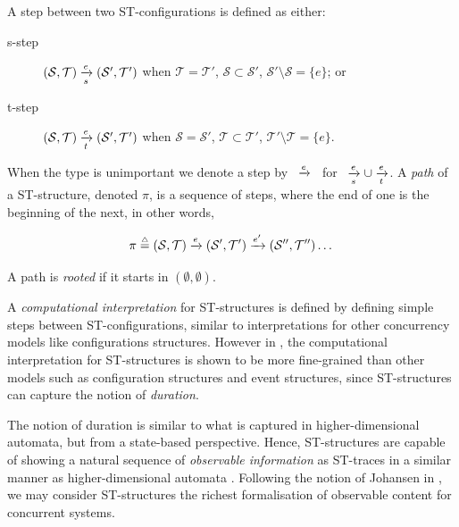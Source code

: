     \begin{definition}
    \label{def:st-steps}
        A step between two ST-configurations is defined as either:
        
        \begin{description}
            \item[s-step] $(\mathcal{S},\mathcal{T})\xrightarrow[s]{e}(\mathcal{S}',\mathcal{T}')$ when $\mathcal{T}=\mathcal{T}'$, $\mathcal{S} \subset \mathcal{S}'$, $\mathcal{S}' \setminus \mathcal{S}=\{e\}$; or
            \item[t-step] $(\mathcal{S},\mathcal{T})\xrightarrow[t]{e}(\mathcal{S}',\mathcal{T}')$ when $\mathcal{S}=\mathcal{S}'$, $\mathcal{T} \subset \mathcal{T}'$, $\mathcal{T}' \setminus \mathcal{T}=\{e\}$.
        \end{description}
        When the type is unimportant we denote a step by \, $\xrightarrow{e}$ \, for \, $\xrightarrow[s]{e}\cup\xrightarrow[t]{e}$. A \emph{path} of a ST-structure, denoted $\pi$, is a sequence of steps, where the end of one is the beginning of the next, in other words,
        
        \[
            \pi\overset{\scriptscriptstyle\triangle}{=}(\mathcal{S},\mathcal{T})\xrightarrow{e}(\mathcal{S}',\mathcal{T}')\xrightarrow{e'}(\mathcal{S}'',\mathcal{T}'')\dots
        \]

        A path is \emph{rooted} if it starts in $(\emptyset,\emptyset)$.
    \end{definition}
    
    A \emph{computational interpretation} for ST-structures is defined by defining simple steps between ST-configurations, similar to interpretations for other concurrency models like configurations structures. However in \cite[Theorem 3.10]{Johansen16STstruct}, the computational interpretation for ST-structures is shown to be more fine-grained than other models such as configuration structures and event structures, since ST-structures can capture the notion of \emph{duration}.
    
    The notion of duration is similar to what is captured in higher-dimensional automata, but from a state-based perspective. Hence, ST-structures are capable of showing a natural sequence of \emph{observable information} as ST-traces in a similar manner as higher-dimensional automata \cite[Section 7.3]{Glabbeek06HDA}. Following the notion of Johansen in \cite{Johansen16STstruct}, we may consider ST-structures the richest formalisation of observable content for concurrent systems.
    
